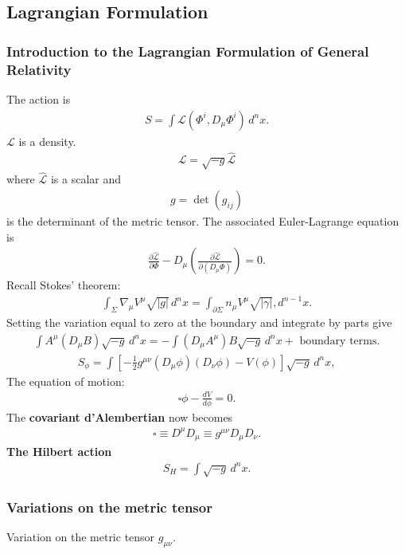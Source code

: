 \documentclass[a4paper,11pt]{article}
\numberwithin{equation}{section}
\theoremstyle{definition}
\newcommand{\p}{\partial}
\newcommand{\lag}{\mathcal{L}}
\begin{document}
\subsection{Lagrangian Formulation}
\subsubsection{Introduction to the Lagrangian Formulation of General Relativity}
The action is
\begin{align}
S = \int \lag (\Phi^i, D_\mu \Phi^i)\,d^nx.
\end{align}
$\lag$ is a density. 
\begin{align}
\lag = \sqrt{-g}\hat{\lag}
\end{align}
where $\hat{\lag}$ is a scalar and
\begin{align}
g = \det(g_{ij})
\end{align}
is the determinant of the metric tensor. The associated Euler-Lagrange equation is
\begin{align}
\frac{\p \hat{\lag}}{\p \Phi} - D_\mu \left( \frac{\p \hat{\lag}}{\p (D_\mu \Phi)}\right) = 0.
\end{align}
Recall Stokes' theorem:
\begin{align}
\int_\Sigma \nabla_\mu V^\mu \sqrt{\vert g\vert}\,d^nx = \int_{\p\Sigma} n_\mu V^\mu \sqrt{\vert \gamma \vert},d^{n-1}x.
\end{align}
Setting the variation equal to zero at the boundary and integrate by parts give
\begin{align}
\int A^\mu (D_\mu B)\sqrt{-g}\,d^nx = -\int (D_\mu A^\mu)B\sqrt{-g}\,d^n x + \text{ boundary terms}.
\end{align}
\begin{align}
S_\phi = \int \left[ -\frac{1}{2}g^{\mu\nu}(D_\mu \phi)(D_\nu\phi) - V(\phi) \right]\sqrt{-g}\,d^nx,
\end{align}
The equation of motion:
\begin{align}
\square \phi - \frac{dV}{d\phi} = 0.
\end{align}
The \textbf{covariant d'Alembertian} now becomes
\begin{align}
\square \equiv D^\mu D_\mu \equiv g^{\mu\nu}D_\mu D_\nu.
\end{align}
\textbf{The Hilbert action}
\begin{align}
S_H = \int \sqrt{-g}\,d^nx.
\end{align}
\subsubsection{Variations on the metric tensor}
Variation on the metric tensor $g_{\mu\nu}$.
\end{document}
